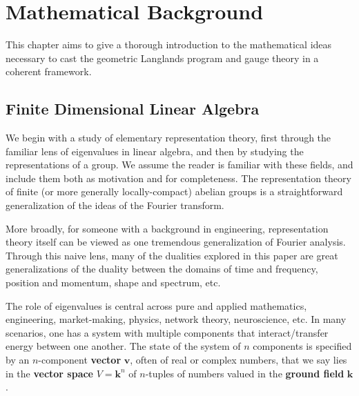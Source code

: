 \chapter{Mathematical Background\label{ch:math}}

	This chapter aims to give a thorough introduction to the mathematical ideas necessary to cast the geometric Langlands program and gauge theory in a coherent framework. 
	
	
	
	\section{Finite Dimensional Linear Algebra} %
	\label{sec:finite_dimensional_linear_algebra}
	
	We begin with a study of elementary representation theory, first through the familiar lens of eigenvalues in linear algebra, and then by studying the representations of a group. We assume the reader is familiar with these fields, and include them both as motivation and for completeness. The representation theory of finite (or more generally locally-compact) abelian groups is a straightforward generalization of the ideas of the Fourier transform. 
	
	More broadly, for someone with a background in engineering, representation theory itself can be viewed as one tremendous generalization of Fourier analysis. 
	Through this naive lens, many of the dualities explored in this paper are great generalizations of the duality between the domains of time and frequency, position and momentum, shape and spectrum, etc. 
	
	
		
		The role of eigenvalues is central across pure and applied mathematics, engineering, market-making, physics, network theory, neuroscience, etc. In many scenarios, one has a system with multiple components that interact/transfer energy between one another. The state of the system of $n$ components is specified by an $n$-component \textbf{vector} $\mathbf v$, often of real or complex numbers, that we say lies in the \textbf{vector space} $V = \mathbf k^n$ of $n$-tuples of numbers valued in the \textbf{ground field} $\mathbf k$. 
%
		
